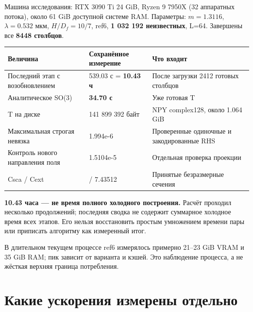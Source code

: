 \documentclass[
  russian,
  11pt,
  a4paper,
]{report}
\newcounter{none} %
\begin{document}
Машина исследования: RTX 3090 Ti 24 GiB, Ryzen 9 7950X (32 аппаратных
потока), около 61 GiB доступной системе RAM. Параметры: \(m=1.3116\),
\(\lambda=0.532\) мкм, \(H/D_f=10/7\), ref6, \textbf{1 032 192
неизвестных}, L=64. Завершены все \textbf{8448 столбцов}.

{\def\LTcaptype{none} %
\begin{longtable}[]{@{}
  >{\raggedright\arraybackslash}p{}
  >{\raggedleft\arraybackslash}p{}
  >{\raggedright\arraybackslash}p{}@{}}
\toprule\noalign{}
\begin{minipage}[b]{\linewidth}\raggedright
Величина
\end{minipage} & \begin{minipage}[b]{\linewidth}\raggedleft
Сохранённое измерение
\end{minipage} & \begin{minipage}[b]{\linewidth}\raggedright
Что входит
\end{minipage} \\
\midrule\noalign{}
\endhead
\bottomrule\noalign{}
\endlastfoot
Последний этап с возобновлением & 37 539.03 с = \textbf{10.43 ч} & После
загрузки 2412 готовых столбцов \\
Аналитическое SO(3) & \textbf{34.70 с} & Уже готовая T \\
T на диске & 1 141 899 392 байт & NPY complex128, около 1.064 GiB \\
Максимальная строгая невязка & 1.994e-6 & Проверенные одиночные и
закодированные RHS \\
Контроль нового направления поля & 1.5104e-5 & Отдельная проверка
проекции \\
Csca / Cext & 7.43199 / 7.43512 & Принятые безразмерные сечения \\
\end{longtable}
}

\textbf{10.43 часа --- не время полного холодного построения.} Расчёт
проходил несколько продолжений; последняя сводка не содержит суммарное
холодное время всех этапов. Его нельзя восстановить простым умножением
времени пары или приписать алгоритму как измеренный итог.

В длительном текущем процессе ref6 измерялось примерно 21--23 GiB VRAM и
35 GiB RAM; пик зависит от варианта и кэшей. Это наблюдение процесса, а
не жёсткая верхняя граница потребления.

\section{Какие ускорения измерены
отдельно}\label{ux43aux430ux43aux438ux435-ux443ux441ux43aux43eux440ux435ux43dux438ux44f-ux438ux437ux43cux435ux440ux435ux43dux44b-ux43eux442ux434ux435ux43bux44cux43dux43e}
\end{document}
